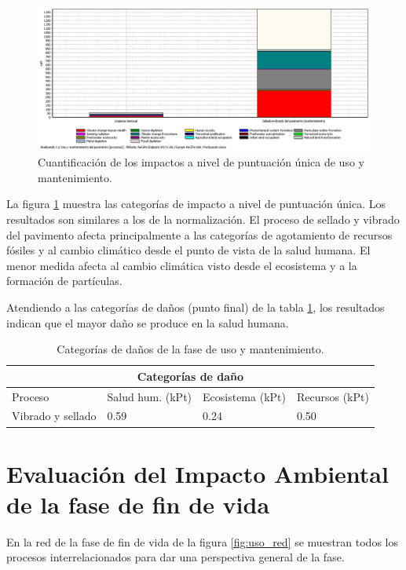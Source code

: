\begin{figure}[!htb]
\centering
\includegraphics[width=15cm]{img/uso_puntuacionunica.png}
\caption{Cuantificación de los impactos a nivel de puntuación única de uso y mantenimiento.}
\label{fig:uso_puntuacionunica}
\end{figure}

La figura \ref{fig:uso_puntuacionunica} muestra las categorías de impacto a nivel de puntuación única. Los resultados son similares a los de la normalización. El proceso de sellado y vibrado del pavimento afecta principalmente a las categorías de agotamiento de recursos fósiles y al cambio climático desde el punto de vista de la salud humana. El menor medida afecta al cambio climática visto desde el ecosistema y a la formación de partículas.

Atendiendo a las categorías de daños (punto final) de la tabla \ref{categoriasdanosuso}, los resultados indican que el mayor daño se produce en la salud humana.

\begin{table}[!htb]
\centering
\begin{tabular}{p{6cm}p{2cm}p{2cm}p{2cm}}
\toprule
\multicolumn{4}{c}{Categorías de daño}\\
\midrule
Proceso & Salud hum. (kPt) & Ecosistema (kPt) & Recursos (kPt)\\
\midrule
Vibrado y sellado & 0.59 & 0.24 & 0.50\\
\bottomrule
\end{tabular}
\caption{Categorías de daños de la fase de uso y mantenimiento.}
\label{categoriasdanosuso}
\end{table}

\section{Evaluación del Impacto Ambiental de la fase de fin de vida}

En la red de la fase de fin de vida de la figura \ref{fig:uso_red} se muestran todos los procesos interrelacionados para dar una perspectiva general de la fase.

